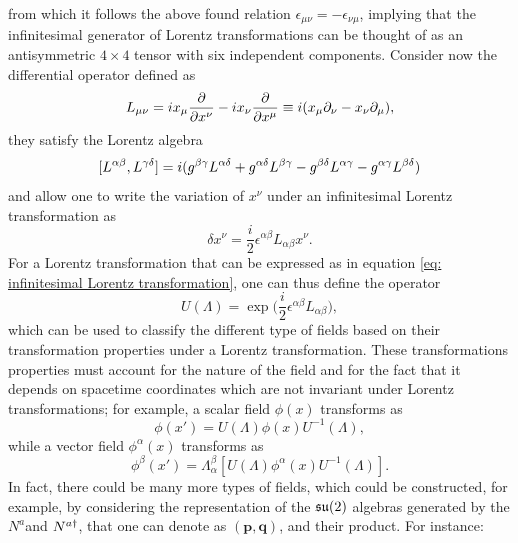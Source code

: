 from which it follows the above found relation $\epsilon_{\mu\nu} = -\epsilon_{\nu\mu}$, implying that the infinitesimal generator of Lorentz transformations can be thought of as an antisymmetric $4 \times 4$ tensor with six independent components. Consider now the differential operator defined as
\begin{equation}
    L_{\mu\nu} = ix_\mu\frac{\partial}{\partial x^\nu} - ix_\nu\frac{\partial}{\partial x^\mu} \equiv i(x_\mu\partial_\nu - x_\nu\partial_\mu),
\end{equation}
they satisfy the Lorentz algebra
\begin{equation}
    [L^{\alpha\beta},L^{\gamma\delta}] = i(g^{\beta\gamma}L^{\alpha\delta} + g^{\alpha\delta}L^{\beta\gamma} - g^{\beta\delta}L^{\alpha\gamma} - g^{\alpha\gamma}L^{\beta\delta})
\end{equation}
and allow one to write the variation of $x^\nu$ under an infinitesimal Lorentz transformation as
\begin{equation}
    \delta x^\nu = \frac{i}{2}\epsilon^{\alpha\beta}L_{\alpha\beta} x^\nu.
\end{equation}
For a Lorentz transformation that can be expressed as in equation \eqref{eq: infinitesimal Lorentz transformation}, one can thus define the operator
\begin{equation}
    U(\Lambda) = \exp{\bigg(\frac{i}{2}\epsilon^{\alpha\beta}L_{\alpha\beta}\bigg)},
\end{equation}
which can be used to classify the different type of fields based on their transformation properties under a Lorentz transformation. These transformations properties must account for the nature of the field and for the fact that it depends on spacetime coordinates which are not invariant under Lorentz transformations; for example, a scalar field $\phi(x)$ transforms as
\begin{equation}
    \phi(x') = U(\Lambda)\phi(x)U^{-1}(\Lambda),
\end{equation}
while a vector field $\phi^\alpha(x)$ transforms as
\begin{equation}
    \phi^\beta(x') = \Lambda^\beta_\alpha[U(\Lambda)\phi^\alpha(x)U^{-1}(\Lambda)].
\end{equation}
In fact, there could be many more types of fields, which could be constructed, for example, by considering the representation of the $\mathfrak{su}(2)$ algebras generated by the $N^a$and $N^{a\dagger}$, that one can denote as $\bm{(p,q)}$, and their product. For instance:
